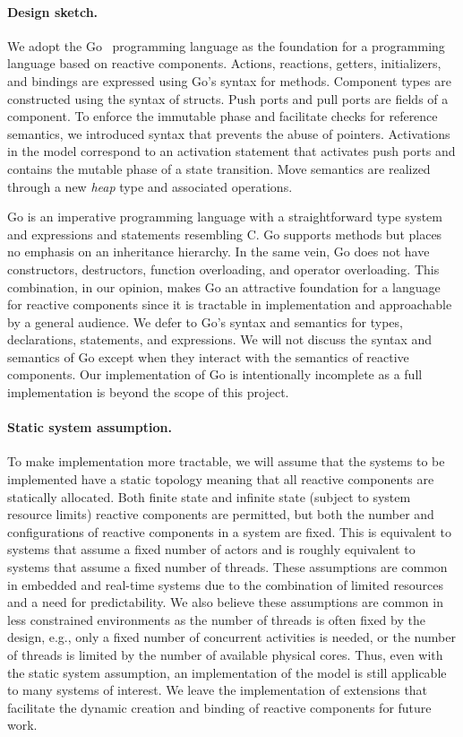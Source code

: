 \paragraph{Design sketch.}
We adopt the Go~\cite{go} programming language as the foundation for a programming language based on reactive components.
Actions, reactions, getters, initializers, and bindings are expressed using Go's syntax for methods.
Component types are constructed using the syntax of structs.
Push ports and pull ports are fields of a component.
To enforce the immutable phase and facilitate checks for reference semantics, we introduced syntax that prevents the abuse of pointers.
Activations in the model correspond to an activation statement that activates push ports and contains the mutable phase of a state transition.
Move semantics are realized through a new \emph{heap} type and associated operations.

Go is an imperative programming language with a straightforward type system and expressions and statements resembling C.
Go supports methods but places no emphasis on an inheritance hierarchy.
In the same vein, Go does not have constructors, destructors, function overloading, and operator overloading.
This combination, in our opinion, makes Go an attractive foundation for a language for reactive components since it is tractable in implementation and approachable by a general audience.
We defer to Go's syntax and semantics for types, declarations, statements, and expressions.
We will not discuss the syntax and semantics of Go except when they interact with the semantics of reactive components.
Our implementation of Go is intentionally incomplete as a full implementation is beyond the scope of this project.

\paragraph{Static system assumption.}
To make implementation more tractable, we will assume that the systems to be implemented have a static topology meaning that all reactive components are statically allocated.
Both finite state and infinite state (subject to system resource limits) reactive components are permitted, but both the number and configurations of reactive components in a system are fixed.
This is equivalent to systems that assume a fixed number of actors and is roughly equivalent to systems that assume a fixed number of threads.
These assumptions are common in embedded and real-time systems due to the combination of limited resources and a need for predictability.
We also believe these assumptions are common in less constrained environments as the number of threads is often fixed by the design, e.g., only a fixed number of concurrent activities is needed, or the number of threads is limited by the number of available physical cores.
Thus, even with the static system assumption, an implementation of the model is still applicable to many systems of interest.
We leave the implementation of extensions that facilitate the dynamic creation and binding of reactive components for future work.

